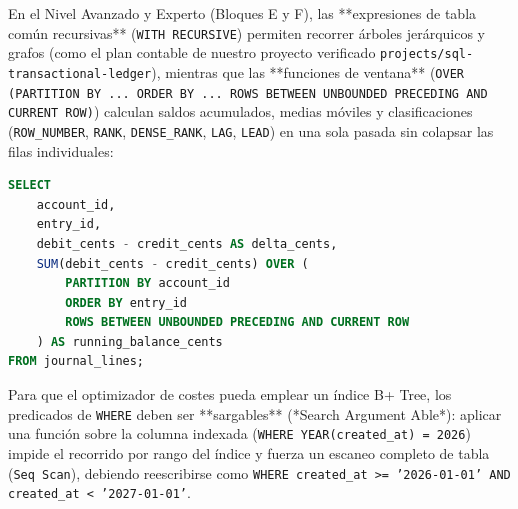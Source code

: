 \documentclass{book}
\begin{document}
En el Nivel Avanzado y Experto (Bloques E y F), las **expresiones de tabla común recursivas** (\texttt{WITH RECURSIVE}) permiten recorrer árboles jerárquicos y grafos (como el plan contable de nuestro proyecto verificado \texttt{projects/sql-transactional-ledger}), mientras que las **funciones de ventana** (\texttt{OVER (PARTITION BY ... ORDER BY ... ROWS BETWEEN UNBOUNDED PRECEDING AND CURRENT ROW)}) calculan saldos acumulados, medias móviles y clasificaciones (\texttt{ROW\_NUMBER}, \texttt{RANK}, \texttt{DENSE\_RANK}, \texttt{LAG}, \texttt{LEAD}) en una sola pasada sin colapsar las filas individuales:
\begin{lstlisting}[style=studium,language={SQL}]
SELECT
    account_id,
    entry_id,
    debit_cents - credit_cents AS delta_cents,
    SUM(debit_cents - credit_cents) OVER (
        PARTITION BY account_id
        ORDER BY entry_id
        ROWS BETWEEN UNBOUNDED PRECEDING AND CURRENT ROW
    ) AS running_balance_cents
FROM journal_lines;
\end{lstlisting}
Para que el optimizador de costes pueda emplear un índice B+ Tree, los predicados de \texttt{WHERE} deben ser **sargables** (*Search Argument Able*): aplicar una función sobre la columna indexada (\texttt{WHERE YEAR(created\_at) = 2026}) impide el recorrido por rango del índice y fuerza un escaneo completo de tabla (\texttt{Seq Scan}), debiendo reescribirse como \texttt{WHERE created\_at >= '2026-01-01' AND created\_at < '2027-01-01'}.
\end{document}
